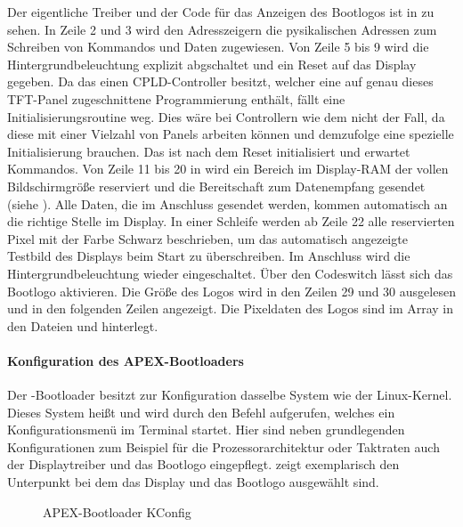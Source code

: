 Der eigentliche Treiber und der Code für das Anzeigen des Bootlogos ist in  zu sehen. In Zeile 2 und 3 wird den Adresszeigern die pysikalischen Adressen zum Schreiben von Kommandos und Daten zugewiesen. Von Zeile 5 bis 9 wird die Hintergrundbeleuchtung explizit abgschaltet und ein Reset auf das Display gegeben. Da das  einen CPLD-Controller besitzt, welcher eine auf genau dieses TFT-Panel zugeschnittene Programmierung enthält, fällt eine Initialisierungsroutine weg. Dies wäre bei Controllern wie dem  nicht der Fall, da diese mit einer Vielzahl von Panels arbeiten können und demzufolge eine spezielle Initialisierung brauchen. Das  ist nach dem Reset initialisiert und erwartet Kommandos. Von Zeile 11 bis 20 in  wird ein Bereich im Display-RAM der vollen Bildschirmgröße reserviert und die Bereitschaft zum Datenempfang gesendet (siehe ). Alle Daten, die im Anschluss gesendet werden, kommen automatisch an die richtige Stelle im Display. In einer Schleife werden ab Zeile 22 alle reservierten Pixel mit der Farbe Schwarz beschrieben, um das automatisch angezeigte Testbild des Displays beim Start zu überschreiben. Im Anschluss wird die Hintergrundbeleuchtung wieder eingeschaltet. Über den Codeswitch  lässt sich das Bootlogo aktivieren. Die Größe des Logos wird in den Zeilen 29 und 30 ausgelesen und in den folgenden Zeilen angezeigt. Die Pixeldaten des Logos sind im Array  in den Dateien  und  hinterlegt.


\paragraph{Konfiguration des APEX-Bootloaders}
\label{cha:config_apex}
Der -Bootloader besitzt zur Konfiguration dasselbe System wie der Linux-Kernel. Dieses System heißt  und wird durch den Befehl  aufgerufen, welches ein Konfigurationsmenü im Terminal startet. Hier sind neben grundlegenden Konfigurationen zum Beispiel für die Prozessorarchitektur oder Taktraten auch der Displaytreiber und das Bootlogo eingepflegt.  zeigt exemplarisch den Unterpunkt  bei dem das Display  und das Bootlogo ausgewählt sind. 

\begin{figure}[tbph]
	\centering
{}
	\caption{APEX-Bootloader KConfig}
	\label{fig:apex_config}
\end{figure}
\newpage

